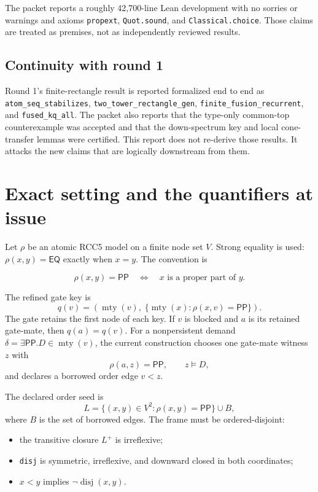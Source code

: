 \documentclass[11pt]{article}
\newcommand{\PP}{\mathsf{PP}}
\newcommand{\EQ}{\mathsf{EQ}}
\newcommand{\mty}{\operatorname{mty}}
\begin{document}
The packet reports a roughly 42,700-line Lean development with no sorries or warnings
and axioms \texttt{propext}, \texttt{Quot.sound}, and
\texttt{Classical.choice}. Those claims are treated as premises, not as independently
reviewed results.

\subsection{Continuity with round 1}

Round 1's finite-rectangle result is reported formalized end to end as
\texttt{atom\_seq\_stabilizes}, \texttt{two\_tower\_rectangle\_gen},
\texttt{finite\_fusion\_recurrent}, and \texttt{fused\_kq\_all}. The packet also
reports that the type-only common-top counterexample was accepted and that the
down-spectrum key and local cone-transfer lemmas were certified. This report does not
re-derive those results. It attacks the new claims that are logically downstream from
them.

\section{Exact setting and the quantifiers at issue}

Let $\rho$ be an atomic RCC5 model on a finite node set $V$. Strong equality is used:
$\rho(x,y)=\EQ$ exactly when $x=y$. The convention is

\[
  \rho(x,y)=\PP \quad\Longleftrightarrow\quad x\text{ is a proper part of }y.
\]

The refined gate key is
\[
  q(v)=\left(\mty(v),\;\{\mty(x):\rho(x,v)=\PP\}\right).
\]
The gate retains the first node of each key. If $v$ is blocked and $a$ is its retained
gate-mate, then $q(a)=q(v)$. For a nonpersistent demand
$\delta=\exists\PP.D\in\mty(v)$, the current construction chooses one gate-mate
witness $z$ with
\[
  \rho(a,z)=\PP,\qquad z\models D,
\]
and declares a borrowed order edge $v<z$.

The declared order seed is
\[
  L=\{(x,y)\in V^2:\rho(x,y)=\PP\}\cup B,
\]
where $B$ is the set of borrowed edges. The frame must be ordered-disjoint:

\begin{itemize}
  \item the transitive closure $L^+$ is irreflexive;
  \item \texttt{disj} is symmetric, irreflexive, and downward closed in both
        coordinates;
  \item $x<y$ implies $\neg\operatorname{disj}(x,y)$.
\end{itemize}
\end{document}
